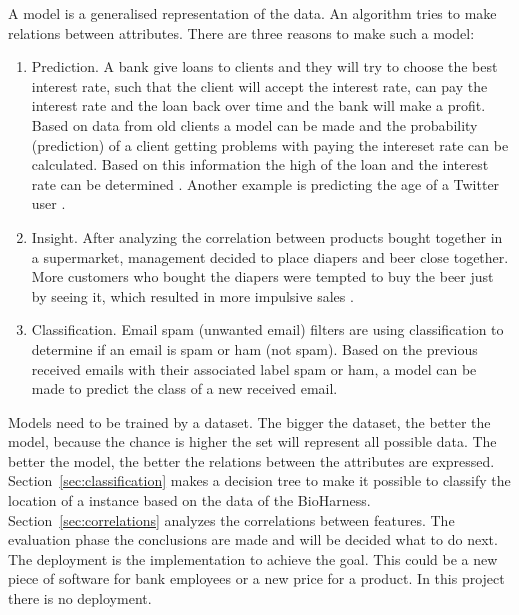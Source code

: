 	A model is a generalised representation of the data. An algorithm tries to make relations between attributes. There are three reasons to make such a model:
	\begin{enumerate}
		\item Prediction. A bank give loans to clients and they will try to choose the best interest rate, such that the client will accept the interest rate, can pay the interest rate and the loan back over time and the bank will make a profit. Based on data from old clients a model can be made and the probability (prediction) of a client getting problems with paying the intereset rate can be calculated. Based on this information the high of the loan and the interest rate can be determined \cite{credit}. Another example is predicting the age of a Twitter user \cite{tweetgenie}.		
		\item Insight. After analyzing the correlation between products bought together in a supermarket, management decided to place diapers and beer close together. More customers who bought the diapers were tempted to buy the beer just by seeing it, which resulted in more impulsive sales \cite{beer}.
		\item Classification. Email spam (unwanted email) filters are using classification to determine if an email is spam or ham (not spam). Based on the previous received emails with their associated label spam or ham, a model can be made to predict the class of a new received email. 
	\end{enumerate}
	Models need to be trained by a dataset. The bigger the dataset, the better the model, because the chance is higher the set will represent all possible data. The better the model, the better the relations between the attributes are expressed. Section~\ref{sec:classification} makes a decision tree to make it possible to classify the location of a instance based on the data of the BioHarness. Section~\ref{sec:correlations} analyzes the correlations between features. The evaluation phase the conclusions are made and will be decided what to do next. The deployment is the implementation to achieve the goal. This could be a new piece of software for bank employees or a new price for a product. In this project there is no deployment.

